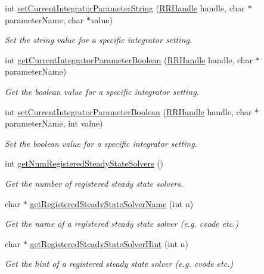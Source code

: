 \begin{DoxyCompactItemize}
int \hyperlink{group__simopts_ga7b901ff654788259368fc15c01fe53a6}{set\+Current\+Integrator\+Parameter\+String} (\hyperlink{rrc__types_8h_a1d68f0592372208fa5a5f2799ea4b3ae}{R\+R\+Handle} handle, char $\ast$parameter\+Name, char $\ast$value)
\begin{DoxyCompactList}\small\item\em Set the string value for a specific integrator setting. \end{DoxyCompactList}\item 
int \hyperlink{group__simopts_gab06f6ef3c9c6b57a2806132b1906a52e}{get\+Current\+Integrator\+Parameter\+Boolean} (\hyperlink{rrc__types_8h_a1d68f0592372208fa5a5f2799ea4b3ae}{R\+R\+Handle} handle, char $\ast$parameter\+Name)
\begin{DoxyCompactList}\small\item\em Get the boolean value for a specific integrator setting. \end{DoxyCompactList}\item 
int \hyperlink{group__simopts_gab89192771385f30f5223756c46bda227}{set\+Current\+Integrator\+Parameter\+Boolean} (\hyperlink{rrc__types_8h_a1d68f0592372208fa5a5f2799ea4b3ae}{R\+R\+Handle} handle, char $\ast$parameter\+Name, int value)
\begin{DoxyCompactList}\small\item\em Set the boolean value for a specific integrator setting. \end{DoxyCompactList}\item 
int \hyperlink{group__simopts_ga210bf6ea10e2c17023a4f108833680e7}{get\+Num\+Registered\+Steady\+State\+Solvers} ()
\begin{DoxyCompactList}\small\item\em Get the number of registered steady state solvers. \end{DoxyCompactList}\item 
char $\ast$ \hyperlink{group__simopts_gae4dfba532a52cfdd6011355a2a48fdd0}{get\+Registered\+Steady\+State\+Solver\+Name} (int n)
\begin{DoxyCompactList}\small\item\em Get the name of a registered steady state solver (e.\+g. cvode etc.) \end{DoxyCompactList}\item 
char $\ast$ \hyperlink{group__simopts_gaf6ac4275f7bc0967d420f15377b189a6}{get\+Registered\+Steady\+State\+Solver\+Hint} (int n)
\begin{DoxyCompactList}\small\item\em Get the hint of a registered steady state solver (e.\+g. cvode etc.) \end{DoxyCompactList}\item 

\end{DoxyCompactItemize}
